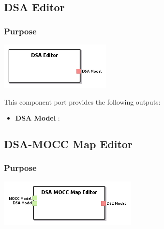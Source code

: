 \documentclass{gemoc} %
\begin{document}
\subsection{DSA Editor}


\subsubsection{Purpose}


\begin{center}
\includegraphics*[trim=0.0cm 0.0cm 0cm 0.0cm, clip=true]{../images/generated/Generated_DSA_Editor.png}
\end{center}


This component port provides the following outputs:
\begin{itemize}
  \item \textbf{DSA Model} :
\end{itemize}


\subsection{DSA-MOCC Map Editor}


\subsubsection{Purpose}


\begin{center}
\includegraphics*[trim=0.0cm 0.0cm 0cm 0.0cm, clip=true]{../images/generated/Generated_DSA-MOCC_Map_Editor.png}
\end{center}
\end{document}
